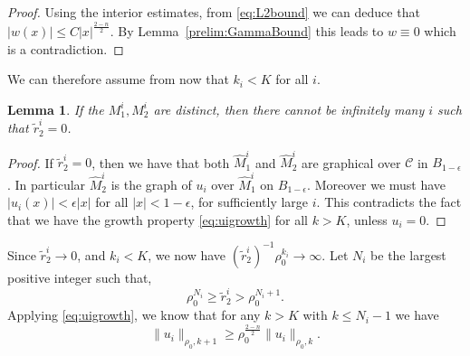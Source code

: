 \documentclass[12pt, reqno ]{amsart}
\newtheorem{lemma}[theorem]{Lemma}
\numberwithin{equation}{section}
\begin{document}
\begin{proof}
Using the interior estimates, from \eqref{eq:L2bound} we can deduce that  $|w(x)|\leq C|x|^{\frac{2-n}{2}}.$ By Lemma~\ref{prelim:GammaBound} this leads to  $w\equiv 0$ which is a contradiction. 
\end{proof}

We can therefore assume from now that $k_i < K$ for all $i$. 
\begin{lemma}
    If the $M^i_1, M^i_2$ are distinct, then 
    there cannot be infinitely many $i$ such that $\tilde{r}^i_2=0$.
\end{lemma}
\begin{proof}
    If $\tilde{r}^i_2 = 0$, then we have that both $\hat M^i_1$ and $\hat M^i_2$ are graphical over $\mathcal{C}$ in $B_{1-\epsilon}$. In particular $\hat M^i_2$ is the graph of $u_i$ over $\hat M^i_1$ on $B_{1-\epsilon}$. Moreover we must have $|u_i(x)| < \epsilon |x|$ for all $|x| < 1-\epsilon$, for sufficiently large $i$. This contradicts the fact that we have the growth property \eqref{eq:uigrowth} for all $k > K$, unless $u_i=0$.  
\end{proof}

Since $\tilde{r}^i_2 \to 0$, and $k_i < K$, we now have
$(\tilde{r}^i_2)^{-1}\rho_0^{k_i}
\rightarrow \infty$.
Let $N_i$ be the largest positive integer such that, 
$$\rho_0^{N_i}\geq \tilde r_2^i > \rho_0^{N_i+1}.$$
Applying \eqref{eq:uigrowth}, we know that for any $k > K$ with $k\leq N_i-1$ we have
\begin{equation}\label{eq:uigrowth2}
\|u_i\|_{\rho_0,k+1}\geq \rho_0^{\frac{2-n}{2}} \|u_i\|_{\rho_0, k}. 
\end{equation}
\end{document}
